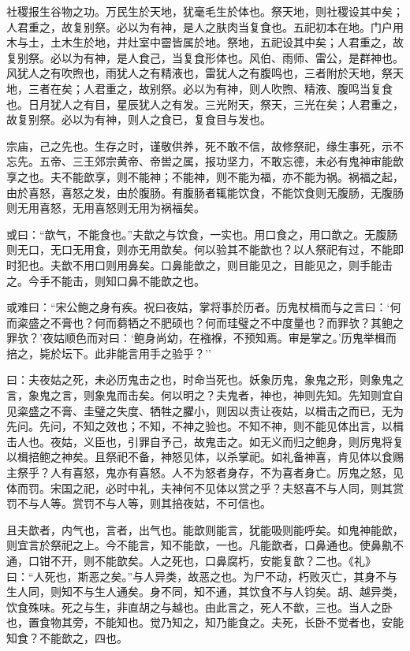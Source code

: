 \documentclass[]{article}
\begin{document}
社稷报生谷物之功。万民生於天地，犹毫毛生於体也。祭天地，则社稷设其中矣；人君重之，故复别祭。必以为有神，是人之肤肉当复食也。五祀初本在地。门户用木与土，土木生於地，井灶室中霤皆属於地。祭地，五祀设其中矣；人君重之，故复别祭。必以为有神，是人食己，当复食形体也。风伯、雨师、雷公，是群神也。风犹人之有吹煦也，雨犹人之有精液也，雷犹人之有腹鸣也，三者附於天地，祭天地，三者在矣；人君重之，故别祭。必以为有神，则人吹煦、精液、腹鸣当复食也。日月犹人之有目，星辰犹人之有发。三光附天，祭天，三光在矣；人君重之，故复别祭。必以为有神，则人之食已，复食目与发也。

宗庙，己之先也。生存之时，谨敬供养，死不敢不信，故修祭祀，缘生事死，示不忘先。五帝、三王郊宗黄帝、帝喾之属，报功坚力，不敢忘德，未必有鬼神审能歆享之也。夫不能歆享，则不能神；不能神，则不能为福，亦不能为祸。祸福之起，由於喜怒，喜怒之发，由於腹肠。有腹肠者辄能饮食，不能饮食则无腹肠，无腹肠则无用喜怒，无用喜怒则无用为祸福矣。

或曰：``歆气，不能食也。''夫歆之与饮食，一实也。用口食之，用口歆之。无腹肠则无口，无口无用食，则亦无用歆矣。何以验其不能歆也？以人祭祀有过，不能即时犯也。夫歆不用口则用鼻矣。口鼻能歆之，则目能见之，目能见之，则手能击之。今手不能击，则知口鼻不能歆之也。

或难曰：``宋公鲍之身有疾。祝曰夜姑，掌将事於历者。历鬼杖楫而与之言曰：`何而粢盛之不膏也？何而蒭牺之不肥硕也？何而珪璧之不中度量也？而罪欤？其鲍之罪欤？'夜姑顺色而对曰：`鲍身尚幼，在襁褓，不预知焉。审是掌之。'历鬼举楫而掊之，毙於坛下。此非能言用手之验乎？''

曰：夫夜姑之死，未必历鬼击之也，时命当死也。妖象历鬼，象鬼之形，则象鬼之言，象鬼之言，则象鬼而击矣。何以明之？夫鬼者，神也，神则先知。先知则宜自见粢盛之不膏、圭璧之失度、牺牲之臞小，则因以责让夜姑，以楫击之而已，无为先问。先问，不知之效也；不知，不神之验也。不知不神，则不能见体出言，以楫击人也。夜姑，义臣也，引罪自予己，故鬼击之。如无义而归之鲍身，则厉鬼将复以楫掊鲍之神矣。且祭祀不备，神怒见体，以杀掌祀。如礼备神喜，肯见体以食赐主祭乎？人有喜怒，鬼亦有喜怒。人不为怒者身存，不为喜者身亡。厉鬼之怒，见体而罚。宋国之祀，必时中礼，夫神何不见体以赏之乎？夫怒喜不与人同，则其赏罚不与人等。赏罚不与人等，则其掊夜姑，不可信也。

且夫歆者，内气也，言者，出气也。能歆则能言，犹能吸则能呼矣。如鬼神能歆，则宜言於祭祀之上。今不能言，知不能歆，一也。凡能歆者，口鼻通也。使鼻鼽不通，口钳不开，则不能歆矣。人之死也，口鼻腐朽，安能复歆？二也。《礼》曰：``人死也，斯恶之矣。''与人异类，故恶之也。为尸不动，朽败灭亡，其身不与生人同，则知不与生人通矣。身不同，知不通，其饮食不与人钧矣。胡、越异类，饮食殊味。死之与生，非直胡之与越也。由此言之，死人不歆，三也。当人之卧也，置食物其旁，不能知也。觉乃知之，知乃能食之。夫死，长卧不觉者也，安能知食？不能歆之，四也。
\end{document}
